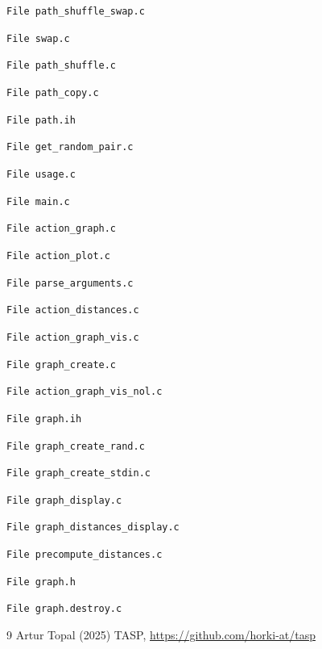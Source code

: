 \documentclass{article}
\begin{document}
\texttt{File path\_shuffle\_swap.c}


\texttt{File swap.c}


\texttt{File path\_shuffle.c}


\texttt{File path\_copy.c}


\texttt{File path.ih}


\texttt{File get\_random\_pair.c}


\texttt{File usage.c}


\texttt{File main.c}


\texttt{File action\_graph.c}


\texttt{File action\_plot.c}


\texttt{File parse\_arguments.c}


\texttt{File action\_distances.c}


\texttt{File action\_graph\_vis.c}


\texttt{File graph\_create.c}


\texttt{File action\_graph\_vis\_nol.c}


\texttt{File graph.ih}


\texttt{File graph\_create\_rand.c}


\texttt{File graph\_create\_stdin.c}


\texttt{File graph\_display.c}


\texttt{File graph\_distances\_display.c}


\texttt{File precompute\_distances.c}


\texttt{File graph.h}


\texttt{File graph.destroy.c}



\begin{thebibliography}{9}
Artur Topal (2025) TASP, \url{https://github.com/horki-at/tasp}
\end{thebibliography}
\end{document}
